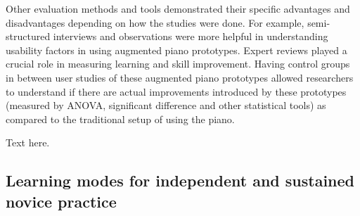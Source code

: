 \documentclass[sigchi, review]{acmart}
\begin{document}
Other evaluation methods and tools demonstrated their specific advantages and disadvantages depending on how the studies were done. For example, semi-structured interviews and observations were more helpful in understanding usability factors in using augmented piano prototypes. Expert reviews played a crucial role in measuring learning and skill improvement. Having control groups in between user studies of these augmented piano prototypes allowed researchers to understand if there are actual improvements introduced by these prototypes (measured by ANOVA, significant difference and other statistical tools) as compared to the traditional setup of using the piano. 




Text here. 

\subsection{Learning modes for independent and sustained novice practice}
\label{subsec: learn}
\end{document}
